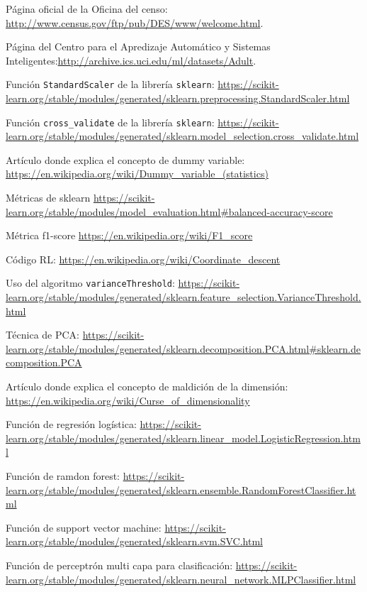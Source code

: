 \documentclass[11pt,a4paper]{article}
\begin{document}
\newpage
\begin{thebibliography}{9}
Página oficial de la Oficina del censo: \url{http://www.census.gov/ftp/pub/DES/www/welcome.html}.

Página del Centro para el Apredizaje Automático y Sistemas Inteligentes:\url{http://archive.ics.uci.edu/ml/datasets/Adult}.

Función \texttt{StandardScaler} de la librería \texttt{sklearn}: \url{https://scikit-learn.org/stable/modules/generated/sklearn.preprocessing.StandardScaler.html}

Función \texttt{cross\_validate} de la librería \texttt{sklearn}:
\url{https://scikit-learn.org/stable/modules/generated/sklearn.model_selection.cross_validate.html}

Artículo donde explica el concepto de dummy variable: \url{https://en.wikipedia.org/wiki/Dummy_variable_(statistics)}

Métricas de sklearn \url{https://scikit-learn.org/stable/modules/model_evaluation.html#balanced-accuracy-score}


Métrica f1-score \url{https://en.wikipedia.org/wiki/F1_score}


Código RL: \url{https://en.wikipedia.org/wiki/Coordinate_descent}


Uso del algoritmo \texttt{varianceThreshold}: \url{https://scikit-learn.org/stable/modules/generated/sklearn.feature_selection.VarianceThreshold.html}

Técnica de PCA: 
\url{https://scikit-learn.org/stable/modules/generated/sklearn.decomposition.PCA.html#sklearn.decomposition.PCA}

Artículo donde explica el concepto de maldición de la dimensión: \url{https://en.wikipedia.org/wiki/Curse_of_dimensionality}

Función de regresión logística:
\url{https://scikit-learn.org/stable/modules/generated/sklearn.linear_model.LogisticRegression.html}

Función de ramdon forest:
\url{https://scikit-learn.org/stable/modules/generated/sklearn.ensemble.RandomForestClassifier.html}

Función de support vector machine:
\url{https://scikit-learn.org/stable/modules/generated/sklearn.svm.SVC.html}

Función de perceptrón multi capa para clasificación:
\url{https://scikit-learn.org/stable/modules/generated/sklearn.neural_network.MLPClassifier.html}

\end{thebibliography}
\end{document}
